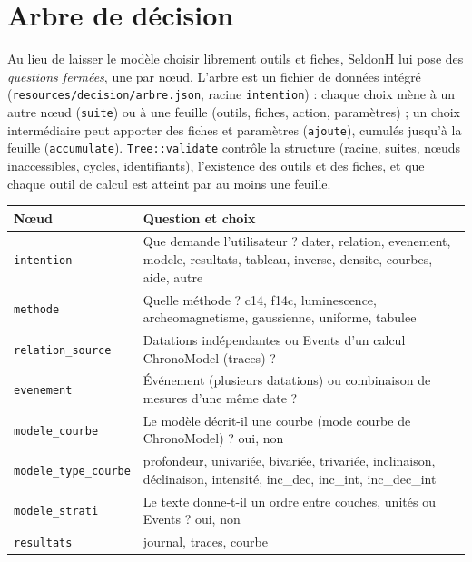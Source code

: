 \documentclass[11pt,a4paper]{article}
\newcommand{\code}[1]{\texttt{\small #1}}
\begin{document}
\section{Arbre de décision}\label{sec:arbre}

Au lieu de laisser le modèle choisir librement outils et fiches, SeldonH lui pose des \emph{questions fermées}, une par
nœud. L'arbre est un fichier de données intégré (\code{resources/decision/arbre.json}, racine \code{intention}) :
chaque choix mène à un autre nœud (\code{suite}) ou à une feuille (outils, fiches, action, paramètres) ; un choix
intermédiaire peut apporter des fiches et paramètres (\code{ajoute}), cumulés jusqu'à la feuille (\code{accumulate}).
\code{Tree::validate} contrôle la structure (racine, suites, nœuds inaccessibles, cycles, identifiants), l'existence
des outils et des fiches, et que chaque outil de calcul est atteint par au moins une feuille.

\begin{center}\small
\begin{tabularx}{\linewidth}{@{}l X@{}}
\toprule
\textbf{Nœud} & \textbf{Question et choix} \\ \midrule
\code{intention} & Que demande l'utilisateur ? dater, relation, evenement, modele, resultats, tableau, inverse,
  densite, courbes, aide, autre \\
\code{methode} & Quelle méthode ? c14, f14c, luminescence, archeomagnetisme, gaussienne, uniforme, tabulee \\
\code{relation\_source} & Datations indépendantes ou Events d'un calcul ChronoModel (traces) ? \\
\code{evenement} & Événement (plusieurs datations) ou combinaison de mesures d'une même date ? \\
\code{modele\_courbe} & Le modèle décrit-il une courbe (mode courbe de ChronoModel) ? oui, non \\
\code{modele\_type\_courbe} & profondeur, univariée, bivariée, trivariée, inclinaison, déclinaison, intensité,
  inc\_dec, inc\_int, inc\_dec\_int \\
\code{modele\_strati} & Le texte donne-t-il un ordre entre couches, unités ou Events ? oui, non \\
\code{resultats} & journal, traces, courbe \\
\bottomrule
\end{tabularx}
\end{center}
\end{document}
